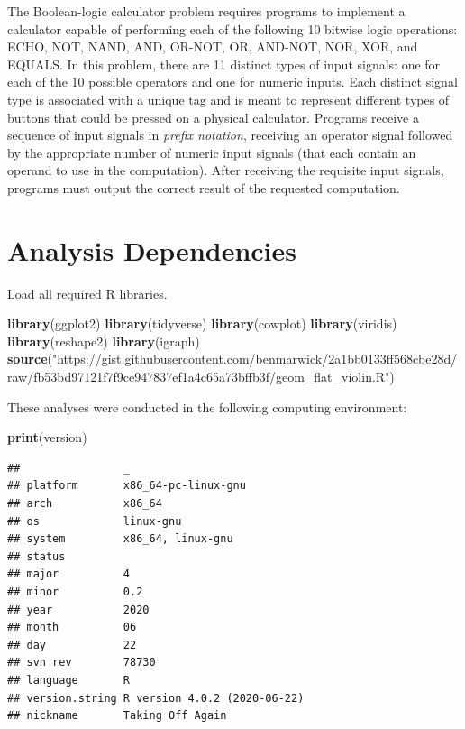 \documentclass[
]{book}
\newenvironment{Shaded}{\begin{snugshade}}{\end{snugshade}}
\newcommand{\KeywordTok}[1]{\textcolor[rgb]{0.13,0.29,0.53}{\textbf{#1}}}
\newcommand{\NormalTok}[1]{#1}
\newcommand{\StringTok}[1]{\textcolor[rgb]{0.31,0.60,0.02}{#1}}
\begin{document}
The Boolean-logic calculator problem requires programs to implement a calculator capable of performing each of the following 10 bitwise logic operations:
ECHO, NOT, NAND, AND, OR-NOT, OR, AND-NOT, NOR, XOR, and EQUALS.
In this problem, there are 11 distinct types of input signals: one for each of the 10 possible operators and one for numeric inputs.
Each distinct signal type is associated with a unique tag and is meant to represent different types of buttons that could be pressed on a physical calculator.
Programs receive a sequence of input signals in \emph{prefix notation}, receiving an operator signal followed by the appropriate number of numeric input signals (that each contain an operand to use in the computation).
After receiving the requisite input signals, programs must output the correct result of the requested computation.

\hypertarget{analysis-dependencies-3}{%
\section{Analysis Dependencies}\label{analysis-dependencies-3}}

Load all required R libraries.

\begin{Shaded}
\begin{Highlighting}[]
\KeywordTok{library}\NormalTok{(ggplot2)}
\KeywordTok{library}\NormalTok{(tidyverse)}
\KeywordTok{library}\NormalTok{(cowplot)}
\KeywordTok{library}\NormalTok{(viridis)}
\KeywordTok{library}\NormalTok{(reshape2)}
\KeywordTok{library}\NormalTok{(igraph)}
\KeywordTok{source}\NormalTok{(}\StringTok{"https://gist.githubusercontent.com/benmarwick/2a1bb0133ff568cbe28d/raw/fb53bd97121f7f9ce947837ef1a4c65a73bffb3f/geom\_flat\_violin.R"}\NormalTok{)}
\end{Highlighting}
\end{Shaded}

These analyses were conducted in the following computing environment:

\begin{Shaded}
\begin{Highlighting}[]
\KeywordTok{print}\NormalTok{(version)}
\end{Highlighting}
\end{Shaded}

\begin{verbatim}
##                _                           
## platform       x86_64-pc-linux-gnu         
## arch           x86_64                      
## os             linux-gnu                   
## system         x86_64, linux-gnu           
## status                                     
## major          4                           
## minor          0.2                         
## year           2020                        
## month          06                          
## day            22                          
## svn rev        78730                       
## language       R                           
## version.string R version 4.0.2 (2020-06-22)
## nickname       Taking Off Again
\end{verbatim}
\end{document}
